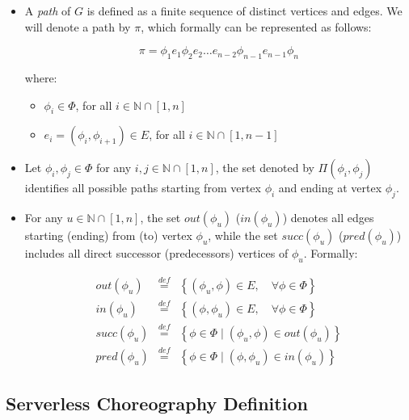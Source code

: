 \documentclass[12pt,a4paper]{report}
\newcommand{\mathDef}{\overset{\textit{def}}{=}}
\newcommand{\N}{\mathbb{N}}
\begin{document}
\begin{itemize}
	\item A \textit{path} of $G$ is defined as a finite sequence of distinct vertices and edges. We will denote a path by $\pi$, which formally can be represented as follows:
	
	\begin{equation}
		\pi = \phi_1 e_1 \phi_2 e_2 \ldots e_{n-2}\phi_{n-1} e_{n-1} \phi_n
	\end{equation}
	
	where:
	
	\begin{itemize}
		\item $\phi_i \in \Phi$, for all $i \in \N \cap \left[ 1, n \right]$
		\item $e_i = \left( \phi_i, \phi_{i+1} \right) \in E$, for all $i \in \N \cap \left[ 1, n-1 \right]$
	\end{itemize}
	
	\item Let $\phi_i,\phi_j \in \Phi$ for any $i,j \in \N \cap \left[ 1, n \right]$, the set denoted by $\Pi(\phi_i, \phi_j)$ identifies all possible paths starting from vertex $\phi_i$ and ending at vertex $\phi_j$.
	
	\item For any $u \in \N \cap \left[ 1, n \right]$, the set $out(\phi_u)$ ($in(\phi_u)$) denotes all edges starting (ending) from (to) vertex $\phi_u$, while the set $succ(\phi_u)$ ($pred(\phi_u)$) includes all direct successor (predecessors) vertices of $\phi_u$. Formally:
	
	\begin{eqnarray}\label{outDef}
		out(\phi_u) & \mathDef & \left\lbrace (\phi_u, \phi) \in E, \quad \forall \phi \in \Phi  \right\rbrace \\
		in(\phi_u) & \mathDef & \left\lbrace (\phi, \phi_u) \in E, \quad \forall \phi \in \Phi  \right\rbrace \\
		succ(\phi_u) & \mathDef & \left\lbrace \phi \in \Phi \mid (\phi_u, \phi) \in out(\phi_u)  \right\rbrace \\
		pred(\phi_u) & \mathDef & \left\lbrace \phi \in \Phi \mid (\phi, \phi_u) \in in(\phi_u)  \right\rbrace 
	\end{eqnarray}
\end{itemize}

\subsection{Serverless Choreography Definition}
\end{document}
